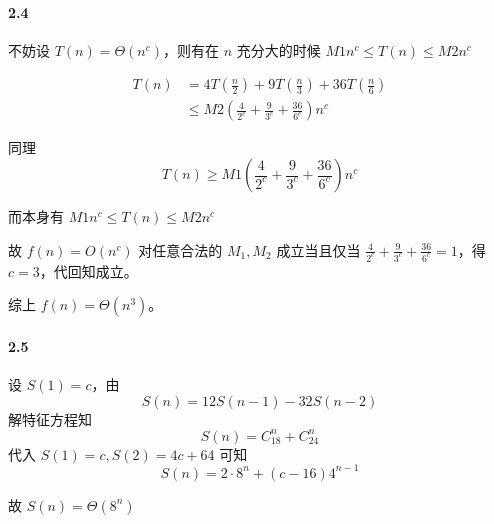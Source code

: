\documentclass[12pt, a4paper, oneside]{ctexart}
\begin{document}
	\paragraph{2.4}
	
	不妨设 $T(n)=\Theta(n^c)$，则有在 $n$ 充分大的时候 $M1n^c\leq T(n) \leq M2n^c$
	
	$$
	\begin{aligned}
		T(n)&=4T(\frac n 2 ) + 9 T(\frac n 3) + 36T(\frac n 6)\\
		&\leq M2(\frac{4}{2^c}+\frac{9}{3^c}+\frac{36}{6^c})n^c
	\end{aligned}
	$$
	
	同理 $$T(n)\geq M1(\frac{4}{2^c}+\frac{9}{3^c}+\frac{36}{6^c})n^c$$
	
	而本身有 $M1n^c\leq T(n) \leq M2n^c$
	
	故 $f(n)=O(n^c)$ 对任意合法的 $M_1,M_2$ 成立当且仅当 $\frac{4}{2^c}+\frac{9}{3^c}+\frac{36}{6^c}=1$，得 $c=3$，代回知成立。
	
	综上 $f(n) = \Theta(n^3)$。
	
	\paragraph{2.5}
	
	设 $S(1)=c$，由 $$S(n)=12S(n-1)-32S(n-2)$$ 解特征方程知 $$S(n)=C_18^n+C_24^n$$ 代入 $S(1)=c,S(2)=4c+64$ 可知 $$S(n)=2\cdot 8^n+(c-16)4^{n-1}$$
	
	故 $S(n)=\Theta(8^n)$
	
\end{document}
